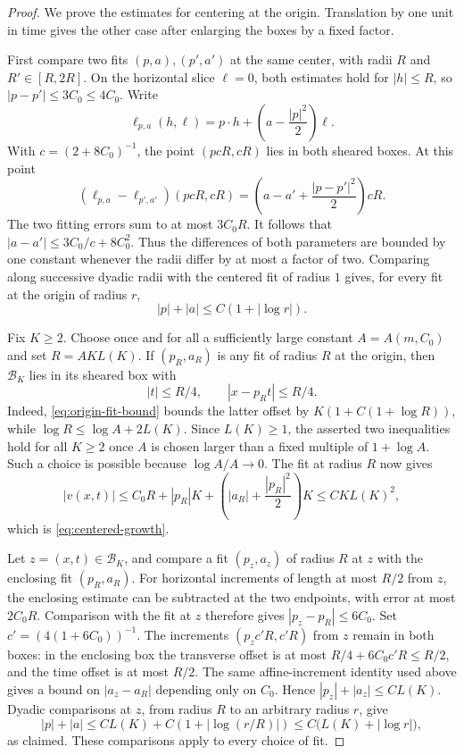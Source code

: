 \documentclass[11pt]{article}
\numberwithin{equation}{section}
\theoremstyle{definition}
\theoremstyle{remark}
\begin{document}
\begin{proof}
We prove the estimates for centering at the origin. Translation by
one unit in time gives the other case after enlarging the boxes by a
fixed factor.

First compare two fits $(p,a),(p',a')$ at the same center, with
radii $R$ and $R'\in[R,2R]$. On the horizontal slice $\ell=0$,
both estimates hold for $|h|\le R$, so
$|p-p'|\le 3C_0\le4C_0$. Write
\[
  \ell_{p,a}(h,\ell)=p\cdot h+
                \left(a-\frac{|p|^2}{2}\right)\ell.
\]
With $c=(2+8C_0)^{-1}$, the point $(p cR,cR)$ lies in both sheared
boxes. At this point
\[
  (\ell_{p,a}-\ell_{p',a'})(p cR,cR)
    =\left(a-a'+\frac{|p-p'|^2}{2}\right)cR.
\]
The two fitting errors sum to at most $3C_0R$. It follows that
$|a-a'|\le 3C_0/c+8C_0^2$. Thus the differences of both parameters
are bounded by one constant whenever the radii differ by at most a
factor of two. Comparing along successive dyadic radii with the
centered fit of radius $1$ gives, for every fit at the origin of
radius $r$,
\begin{equation}\label{eq:origin-fit-bound}
  |p|+|a|\le C(1+|\log r|).
\end{equation}

Fix $K\ge2$. Choose once and for all a sufficiently large constant
$A=A(m,C_0)$ and set
$R=A K L(K)$. If $(p_R,a_R)$ is any fit of radius $R$ at the
origin, then $\mathcal B_K$ lies in its sheared box with
\[
  |t|\le R/4,\qquad |x-p_Rt|\le R/4.
\]
Indeed, \eqref{eq:origin-fit-bound} bounds the latter offset by
$K(1+C(1+\log R))$, while
$\log R\le\log A+2L(K)$. Since $L(K)\ge1$, the asserted two
inequalities hold for all $K\ge2$ once $A$ is chosen larger than a
fixed multiple of $1+\log A$. Such a choice is possible because
$\log A/A\to0$. The fit at radius $R$ now gives
\[
  |v(x,t)|
  \le C_0R+|p_R|K+
      \left(|a_R|+\frac{|p_R|^2}{2}\right)K
  \le C K L(K)^2,
\]
which is \eqref{eq:centered-growth}.

Let $z=(x,t)\in\mathcal B_K$, and compare a fit $(p_z,a_z)$ of
radius $R$ at $z$ with the enclosing fit $(p_R,a_R)$. For
horizontal increments of length at most $R/2$ from $z$, the
enclosing estimate can be subtracted at the two endpoints, with
error at most $2C_0R$. Comparison with the fit at $z$ therefore
gives $|p_z-p_R|\le6C_0$. Set
$c'=(4(1+6C_0))^{-1}$. The increments
$(p_z c'R,c'R)$ from $z$ remain in both boxes: in the enclosing
box the transverse offset is at most
$R/4+6C_0c'R\le R/2$, and the time offset is at most $R/2$.
The same affine-increment identity used above gives a bound on
$|a_z-a_R|$ depending only on $C_0$. Hence
$|p_z|+|a_z|\le C L(K)$. Dyadic comparisons at $z$, from radius
$R$ to an arbitrary radius $r$, give
\[
  |p|+|a|
  \le C L(K)+C(1+|\log(r/R)|)
  \le C\bigl(L(K)+|\log r|\bigr),
\]
as claimed. These comparisons apply to every choice of fit.


\end{proof}
\end{document}
